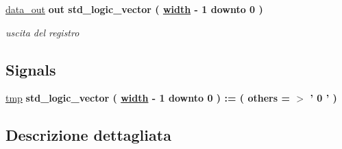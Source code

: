\begin{DoxyCompactItemize}
\hyperlink{group___generic_buffer_ga0bf60a72cb11ffe1945b82ce0bb86a57}{data\+\_\+out}  {\bfseries {\bfseries \textcolor{vhdlchar}{out}\textcolor{vhdlchar}{ }}} {\bfseries \textcolor{vhdlchar}{std\+\_\+logic\+\_\+vector}\textcolor{vhdlchar}{ }\textcolor{vhdlchar}{(}\textcolor{vhdlchar}{ }\textcolor{vhdlchar}{ }\textcolor{vhdlchar}{ }\textcolor{vhdlchar}{ }{\bfseries \hyperlink{group___generic_buffer_gae47d961480346c1d82439a66505e6e7d}{width}} \textcolor{vhdlchar}{-\/}\textcolor{vhdlchar}{ } \textcolor{vhdldigit}{1} \textcolor{vhdlchar}{ }\textcolor{vhdlchar}{downto}\textcolor{vhdlchar}{ }\textcolor{vhdlchar}{ } \textcolor{vhdldigit}{0} \textcolor{vhdlchar}{ }\textcolor{vhdlchar}{)}\textcolor{vhdlchar}{ }} 
\begin{DoxyCompactList}\small\item\em uscita del registro \end{DoxyCompactList}\end{DoxyCompactItemize}
\subsection*{Signals}
 \begin{DoxyCompactItemize}
\item 
\hyperlink{group___generic_buffer_gab94e66105790803865249c33633e359f}{tmp} {\bfseries \textcolor{vhdlchar}{std\+\_\+logic\+\_\+vector}\textcolor{vhdlchar}{ }\textcolor{vhdlchar}{(}\textcolor{vhdlchar}{ }\textcolor{vhdlchar}{ }\textcolor{vhdlchar}{ }\textcolor{vhdlchar}{ }{\bfseries \hyperlink{group___generic_buffer_gae47d961480346c1d82439a66505e6e7d}{width}} \textcolor{vhdlchar}{-\/}\textcolor{vhdlchar}{ } \textcolor{vhdldigit}{1} \textcolor{vhdlchar}{ }\textcolor{vhdlchar}{downto}\textcolor{vhdlchar}{ }\textcolor{vhdlchar}{ } \textcolor{vhdldigit}{0} \textcolor{vhdlchar}{ }\textcolor{vhdlchar}{)}\textcolor{vhdlchar}{ }\textcolor{vhdlchar}{ }\textcolor{vhdlchar}{ }\textcolor{vhdlchar}{\+:}\textcolor{vhdlchar}{=}\textcolor{vhdlchar}{ }\textcolor{vhdlchar}{(}\textcolor{vhdlchar}{ }\textcolor{vhdlchar}{ }\textcolor{vhdlchar}{others}\textcolor{vhdlchar}{ }\textcolor{vhdlchar}{ }\textcolor{vhdlchar}{=}\textcolor{vhdlchar}{ }\textcolor{vhdlchar}{$>$}\textcolor{vhdlchar}{ }\textcolor{vhdlchar}{'}\textcolor{vhdlchar}{ } \textcolor{vhdldigit}{0} \textcolor{vhdlchar}{ }\textcolor{vhdlchar}{'}\textcolor{vhdlchar}{ }\textcolor{vhdlchar}{)}\textcolor{vhdlchar}{ }} 
\end{DoxyCompactItemize}


\subsection{Descrizione dettagliata}


